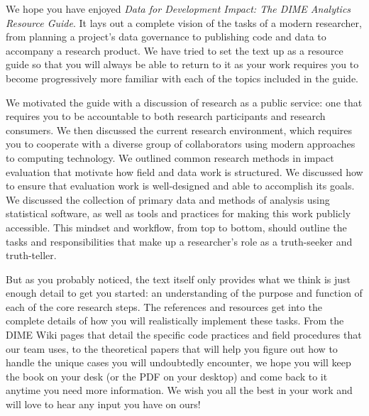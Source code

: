 We hope you have enjoyed \textit{Data for Development Impact: The DIME Analytics Resource Guide}.
It lays out a complete vision of the tasks of a modern researcher,
from planning a project's data governance to publishing code and data
to accompany a research product.
We have tried to set the text up as a resource guide
so that you will always be able to return to it
as your work requires you to become progressively more familiar
with each of the topics included in the guide.

We motivated the guide with a discussion of research as a public service:
one that requires you to be accountable to both research participants
and research consumers.
We then discussed the current research environment,
which requires you to cooperate with a diverse group of collaborators
using modern approaches to computing technology.
We outlined common research methods in impact evaluation
that motivate how field and data work is structured.
We discussed how to ensure that evaluation work is well-designed
and able to accomplish its goals.
We discussed the collection of primary data
and methods of analysis using statistical software,
as well as tools and practices for making this work publicly accessible.
This mindset and workflow, from top to bottom,
should outline the tasks and responsibilities
that make up a researcher's role as a truth-seeker and truth-teller.

But as you probably noticed, the text itself only provides what we think is
just enough detail to get you started:
an understanding of the purpose and function of each of the core research steps.
The references and resources get into the complete details
of how you will realistically implement these tasks.
From the DIME Wiki pages that detail the specific code practices
and field procedures that our team uses,
to the theoretical papers that will help you figure out
how to handle the unique cases you will undoubtedly encounter,
we hope you will keep the book on your desk
(or the PDF on your desktop)
and come back to it anytime you need more information.
We wish you all the best in your work
and will love to hear any input you have on ours!
